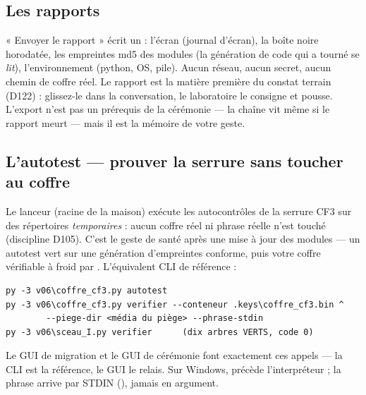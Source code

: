 \subsection{Les rapports}\label{sec:rapports}

« Envoyer le rapport » écrit un  : l'écran (journal d'écran), la boîte
noire horodatée, les empreintes md5 des modules (la génération de code qui a tourné se
\emph{lit}), l'environnement (python, OS, pile). Aucun réseau, aucun secret, aucun
chemin de coffre réel. Le rapport est la matière première du constat terrain (D122) :
glissez-le dans la conversation, le laboratoire le consigne et pousse. L'export n'est
pas un prérequis de la cérémonie — la chaîne vit même si le rapport meurt — mais il
est la mémoire de votre geste.

\subsection{L'autotest — prouver la serrure sans toucher au coffre}\label{sec:autotest}

Le lanceur  (racine de la maison) exécute les
autocontrôles de la serrure CF3 sur des répertoires \emph{temporaires} : aucun coffre
réel ni phrase réelle n'est touché (discipline D105). C'est le geste de santé après
une mise à jour des modules — un autotest vert sur une génération d'empreintes
conforme, puis votre coffre vérifiable à froid par . L'équivalent CLI
de référence :

\begin{lstlisting}
py -3 v06\coffre_cf3.py autotest
py -3 v06\coffre_cf3.py verifier --conteneur .keys\coffre_cf3.bin ^
        --piege-dir <média du piège> --phrase-stdin
py -3 v06\sceau_I.py verifier      (dix arbres VERTS, code 0)
\end{lstlisting}

Le GUI de migration et le GUI de cérémonie font exactement ces appels — la CLI est la
référence, le GUI le relais. Sur Windows,  précède l'interpréteur ; la
phrase arrive par STDIN (), jamais en argument.
